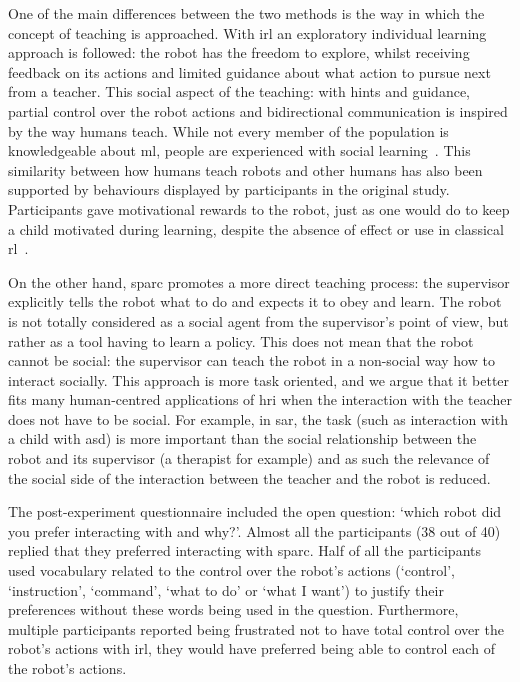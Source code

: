 One of the main differences between the two methods is the way in which the concept of teaching is approached. With \gls{irl} an exploratory individual learning approach is followed: the robot has the freedom to explore, whilst receiving feedback on its actions and limited guidance about what action to pursue next from a teacher. This social aspect of the teaching: with hints and guidance, partial control over the robot actions and bidirectional communication is inspired by the way humans teach. While not every member of the population is knowledgeable about \gls{ml}, people are experienced with social learning~\citep{thomaz2008teachable}. This similarity between how humans teach robots and other humans has also been supported by behaviours displayed by participants in the original study. Participants gave motivational rewards to the robot, just as one would do to keep a child motivated during learning, despite the absence of effect or use in classical \gls{rl}~\citep{thomaz2008teachable}.

On the other hand, \gls{sparc} promotes a more direct teaching process: the supervisor explicitly tells the robot what to do and expects it to obey and learn. The robot is not totally considered as a social agent from the supervisor's point of view, but rather as a tool having to learn a policy. This does not mean that the robot cannot be social: the supervisor can teach the robot in a non-social way how to interact socially. This approach is more task oriented, and we argue that it better fits many human-centred applications of \gls{hri} when the interaction with the teacher does not have to be social. For example, in \gls{sar}, the task (such as interaction with a child with \gls{asd}) is more important than the social relationship between the robot and its supervisor (a therapist for example) and as such the relevance of the social side of the interaction between the teacher and the robot is reduced.

The post-experiment questionnaire included the open question: `which robot did you prefer interacting with and why?'. Almost all the participants (38 out of 40) replied that they preferred interacting with \gls{sparc}. Half of all the participants used vocabulary related to the control over the robot's actions (`control', `instruction', `command', `what to do' or `what I want') to justify their preferences without these words being used in the question. Furthermore, multiple participants reported being frustrated not to have total control over the robot's actions with \gls{irl}, they would have preferred being able to control each of the robot's actions. 

